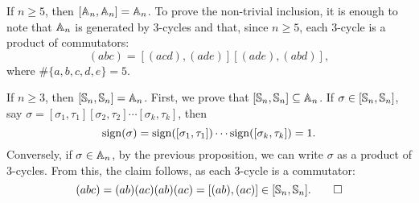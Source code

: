 \begin{example}
If $n\geq5$, then $[\mathbb{A}_n,\mathbb{A}_n]=\mathbb{A}_n$. To prove the non-trivial
inclusion, it is enough to note that $\mathbb{A}_n$ is generated by 
3-cycles and that, since $n\geq5$, each 3-cycle 
is a product of commutators: 
\[
(abc)=[(acd),(ade)][(ade),(abd)],
\]
where $\#\{a,b,c,d,e\}=5$.
\end{example}

\begin{example}
If $n\geq3$, then $[\mathbb{S}_n,\mathbb{S}_n]=\mathbb{A}_n$. First, we prove that $[\mathbb{S}_n,\mathbb{S}_n]\subseteq\mathbb{A}_n$. If 
$\sigma\in[\mathbb{S}_n,\mathbb{S}_n]$,
say $\sigma=[\sigma_1,\tau_1][\sigma_2,\tau_2]\cdots[\sigma_k,\tau_k]$, then
\[
\operatorname{sign}(\sigma)=\operatorname{sign}([\sigma_1,\tau_1])\cdots\operatorname{sign}([\sigma_k,\tau_k])=1.
\]
Conversely, if $\sigma\in\mathbb{A}_n$, by the previous proposition, 
we can write $\sigma$ as a product of 3-cycles. 
From this, the claim follows, as each 3-cycle is a commutator: 
\[
(abc)=(ab)(ac)(ab)(ac)=[(ab),(ac)]\in[\mathbb{S}_n,\mathbb{S}_n].\qedhere
\]
\end{example}